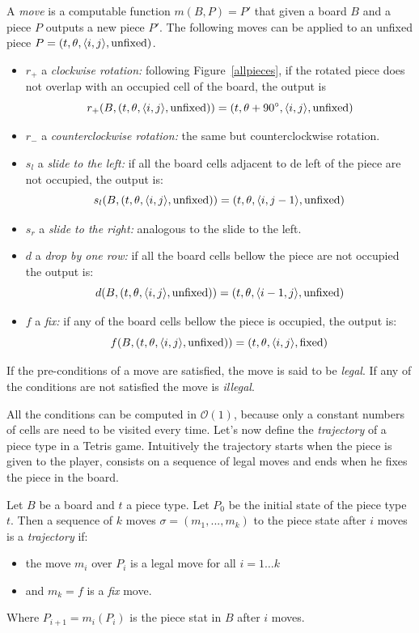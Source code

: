 \begin{definition}
  A \emph{move} is a computable function $m(B, P) = P'$ that given a board $B$ and a piece $P$ outputs a new piece $P'$. The following moves can be applied to an unfixed piece $P = \piece[t][\theta][i][j][\text{unfixed}]$. 
  \begin{itemize}
    \item $r_+$ a \emph{clockwise rotation:} following Figure~\ref{allpieces}, if the rotated piece does not overlap with an occupied cell of the board, the output is 
      $$r_+ (B, \piece[t][\theta][i][j][\text{unfixed}]) = \piece[t][\theta + 90^\circ][i][j][\text{unfixed}]$$

    \item $r_-$ a \emph{counterclockwise rotation:} the same but counterclockwise rotation. 

    \item $s_l$ a \emph{slide to the left:} if all the board cells adjacent to de left of the piece are not occupied, the output is:
      $$s_l (B, \piece[t][\theta][i][j][\text{unfixed}]) = \piece[t][\theta][i][j-1][\text{unfixed}]$$
    \item $s_r$ a \emph{slide to the right:} analogous to the slide to the left.

    \item $d$ a \emph{drop by one row:} if all the board cells bellow the piece are not occupied the output is:
      $$d (B, \piece[t][\theta][i][j][\text{unfixed}]) = \piece[t][\theta][i-1][j][\text{unfixed}]$$

    \item $f$ a \emph{fix:} if any of the board cells bellow the piece is occupied, the output is:
      $$f (B, \piece[t][\theta][i][j][\text{unfixed}]) = \piece[t][\theta][i][j][\text{fixed}]$$
  \end{itemize}
  If the pre-conditions of a move are satisfied, the move is said to be \emph{legal}. If any of the conditions are not satisfied the move is \emph{illegal}.
\end{definition}

All the conditions can be computed in $\mathcal{O}(1)$, because only a constant numbers of cells are need to be visited every time. Let's now define the \emph{trajectory} of a piece type in a Tetris game. Intuitively the trajectory starts when the piece is given to the player, consists on a sequence of legal moves and ends when he fixes the piece in the board. 


\begin{definition}
 Let $B$ be a board and $t$ a piece type. Let $P_0$ be the initial state of the piece type $t$. Then a sequence of $k$ moves $\sigma = (m_1, ..., m_k)$ to the piece state after $i$ moves is a \emph{trajectory} if:

 \begin{itemize}
  \item the move $m_i$ over $P_i$ is a legal move for all $i = 1 \dots k$
  \item and $m_k = f$ is a \emph{fix} move.
 \end{itemize}
 
 Where $P_{i+1} = m_i(P_i)$ is the piece stat in $B$ after $i$ moves.
\end{definition}

